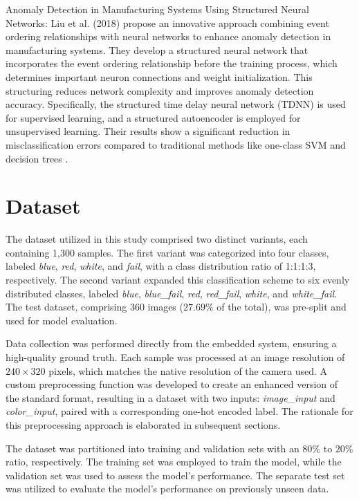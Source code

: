 \documentclass[lettersize,journal]{IEEEtran}
\begin{document}
Anomaly Detection in Manufacturing Systems Using Structured Neural Networks: Liu et al. (2018) propose an innovative approach combining event ordering relationships with neural networks to enhance anomaly detection in manufacturing systems. They develop a structured neural network that incorporates the event ordering relationship before the training process, which determines important neuron connections and weight initialization. This structuring reduces network complexity and improves anomaly detection accuracy. Specifically, the structured time delay neural network (TDNN) is used for supervised learning, and a structured autoencoder is employed for unsupervised learning. Their results show a significant reduction in misclassification errors compared to traditional methods like one-class SVM and decision trees \cite{ref1}.



\section{Dataset}

The dataset utilized in this study comprised two distinct variants, each containing 1,300 samples. The first variant was categorized into four classes, labeled \emph{blue}, \emph{red}, \emph{white}, and \emph{fail}, with a class distribution ratio of 1:1:1:3, respectively. The second variant expanded this classification scheme to six evenly distributed classes, labeled \emph{blue}, \emph{blue\_fail}, \emph{red}, \emph{red\_fail}, \emph{white}, and \emph{white\_fail}. The test dataset, comprising 360 images ($27.69\%$ of the total), was pre-split and used for model evaluation.

Data collection was performed directly from the embedded system, ensuring a high-quality ground truth. Each sample was processed at an image resolution of $240 \times 320$ pixels, which matches the native resolution of the camera used. A custom preprocessing function was developed to create an enhanced version of the standard format, resulting in a dataset with two inputs: \emph{image\_input} and \emph{color\_input}, paired with a corresponding one-hot encoded label. The rationale for this preprocessing approach is elaborated in subsequent sections.

The dataset was partitioned into training and validation sets with an $80\%$ to $20\%$ ratio, respectively. The training set was employed to train the model, while the validation set was used to assess the model's performance. The separate test set was utilized to evaluate the model's performance on previously unseen data.
\end{document}
